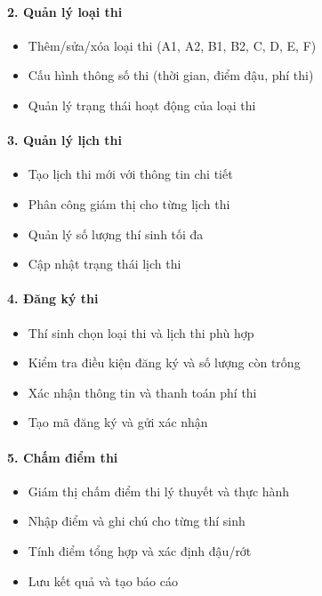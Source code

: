 \documentclass[12pt,a4paper]{article}
\begin{document}
\paragraph{2. Quản lý loại thi}
\begin{itemize}
    \item Thêm/sửa/xóa loại thi (A1, A2, B1, B2, C, D, E, F)
    \item Cấu hình thông số thi (thời gian, điểm đậu, phí thi)
    \item Quản lý trạng thái hoạt động của loại thi
\end{itemize}

\paragraph{3. Quản lý lịch thi}
\begin{itemize}
    \item Tạo lịch thi mới với thông tin chi tiết
    \item Phân công giám thị cho từng lịch thi
    \item Quản lý số lượng thí sinh tối đa
    \item Cập nhật trạng thái lịch thi
\end{itemize}

\paragraph{4. Đăng ký thi}
\begin{itemize}
    \item Thí sinh chọn loại thi và lịch thi phù hợp
    \item Kiểm tra điều kiện đăng ký và số lượng còn trống
    \item Xác nhận thông tin và thanh toán phí thi
    \item Tạo mã đăng ký và gửi xác nhận
\end{itemize}

\paragraph{5. Chấm điểm thi}
\begin{itemize}
    \item Giám thị chấm điểm thi lý thuyết và thực hành
    \item Nhập điểm và ghi chú cho từng thí sinh
    \item Tính điểm tổng hợp và xác định đậu/rớt
    \item Lưu kết quả và tạo báo cáo
\end{itemize}
\end{document}
